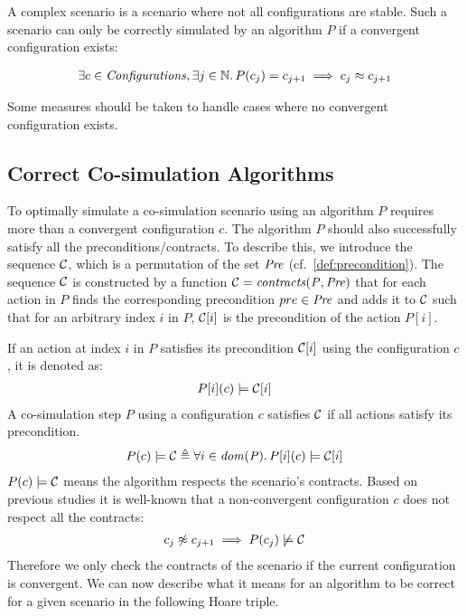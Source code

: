 A complex scenario is a scenario where not all configurations are stable. Such a scenario can only be correctly simulated by an algorithm $P$ if a convergent configuration exists:

\begin{align}
  \exists c \in \mathit{Configurations}, \exists j \in \mathbb{N} \ldotp P(c_{j}) = c_{j+1} \implies c_{j} \approx c_{j+1}
\end{align}

Some measures should be taken to handle cases where no convergent configuration exists.

\subsection{Correct Co-simulation Algorithms}\label{sec:correctcosim}
To optimally simulate a co-simulation scenario using an algorithm $P$ requires more than a convergent configuration $c$. The algorithm $P$ should also successfully satisfy all the preconditions/contracts. To describe this, we introduce the sequence $\mathcal{C}$, which is a permutation of the set $\mathit{Pre}$ (cf.\ \cref{def:precondition}).
The sequence $\mathcal{C}$ is constructed by a function $\mathcal{C} = \mathit{contracts(P, \mathit{Pre})}$ that for each action in $P$ finds the corresponding precondition $pre \in \mathit{Pre}$ and adds it to $\mathcal{C}$ such that for an arbitrary index $i$ in $P$, $\mathcal{C}[i]$ is the precondition of the action $P[i]$.

If an action at index $i$ in $P$ satisfies its precondition $\mathcal{C}[i]$ using the configuration $c$, it is denoted as:
\begin{align}
  P[i](c) \models \mathcal{C}[i]
\end{align}
A co-simulation step $P$ using a configuration $c$ satisfies $\mathcal{C}$ if all actions satisfy its precondition. 
\begin{align}
  P(c) \models \mathcal{C} \triangleq \forall i \in \mathit{dom(P)} \ldotp P[i](c) \models \mathcal{C}[i]
\end{align}
$P(c) \models \mathcal{C}$ means the algorithm respects the scenario's contracts.
Based on previous studies it is well-known that a non-convergent configuration $c$ does not respect all the contracts:
\begin{align}\label{eq:incorrectConf}
  c_j \not\approx c_{j+1} \implies P(c_j) \not\models \mathcal{C}
\end{align}
Therefore we only check the contracts of the scenario if the current configuration is convergent.
We can now describe what it means for an algorithm to be correct for a given scenario in the following Hoare triple.

